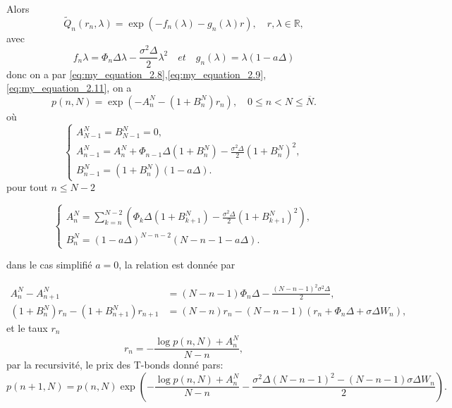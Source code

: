 Alors
\begin{equation}
\tilde{Q}_n(r_n, \lambda) = \exp(-f_n(\lambda) - g_n(\lambda)r), \quad r, \lambda \in \mathbb{R},
\end{equation}
avec 
\begin{equation}
    f_n{\lambda} = \Phi_n \Delta \lambda -\frac{\sigma^2\Delta}{2}\lambda^2 \quad et \quad g_n (\lambda) = \lambda(1-a\Delta)
\end{equation}
donc on a par \ref{eq:my_equation_2.8},\ref{eq:my_equation_2.9},\ref{eq:my_equation_2.11}, on a 
\begin{equation}
    p(n, N) = \exp(-A_n^N - (1 + B_n^N) r_n), \quad 0 \leq n < N \leq \overline{N}.
    \end{equation}
où
\begin{equation}
    \begin{cases}
    A_{N-1}^{N} = B_{N-1}^{N} = 0, \\
    A_{n-1}^{N} = A_n^{N} + \Phi_{n-1} \Delta (1 + B_n^{N}) - \frac{\sigma^2 \Delta}{2} (1 + B_n^{N})^2, \\
    B_{n-1}^{N} = (1 + B_n^{N})(1 - a\Delta).
    \end{cases}
\end{equation}
pour tout $n \le N - 2 $

\begin{equation}
    \begin{cases}
        A_n^N = \sum_{k=n}^{N-2} \left( \Phi_k \Delta (1 + B_{k+1}^N) - \frac{\sigma^2 \Delta}{2} (1 + B_{k+1}^N)^2 \right), \\
    B_n^N = (1 - a\Delta)^{N-n-2} (N - n - 1 - a\Delta).
    \end{cases}
\end{equation}

dans le cas simplifié $a = 0$, la relation est donnée par

\begin{align}
A_n^N - A_{n+1}^N &= (N - n - 1)\Phi_n \Delta - \frac{(N - n - 1)^2 \sigma^2 \Delta}{2}, \\
(1 + B_n^N)r_n - (1 + B_{n+1}^N)r_{n+1} &= (N - n)r_n - (N - n - 1)(r_n + \Phi_n \Delta + \sigma \Delta W_n),
\end{align}
et le taux \( r_n \) 
\begin{equation}
r_n = -\frac{\log p(n, N) + A_n^N}{N - n},
\end{equation}
par la recursivité, le prix des T-bonds donné pars:
\begin{equation}
p(n + 1, N) = p(n, N) \exp\left( -\frac{\log p(n, N) + A_n^N}{N - n} - \frac{\sigma^2 \Delta (N - n - 1)^2 - (N - n - 1)\sigma \Delta W_n}{2} \right).
\end{equation}

